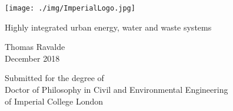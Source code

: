 \begin{titlepage}

  \texttt{[image: ./img/ImperialLogo.jpg]}\\[1cm]

    \begin{center}
        \vspace*{1cm}
        
        {\LARGE Highly integrated urban energy, water and waste systems}
        
        \vspace{1.5cm}
        
        Thomas Ravalde \\
        \vspace{0.8cm}
        December 2018
        
        \vfill
        
        Submitted for the degree of \\
	Doctor of Philosophy in Civil and Environmental Engineering\\
	of Imperial College London
        
    \end{center}

\end{titlepage}
